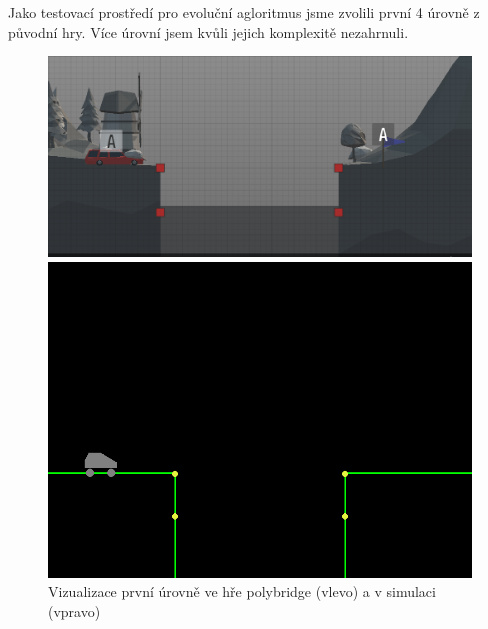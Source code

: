 Jako testovací prostředí pro evoluční agloritmus jsme zvolili první 4 úrovně z původní hry. Více úrovní jsem kvůli jejich komplexitě nezahrnuli.

\begin{figure}[ht]
    \centering
    \begin{minipage}{0.49\textwidth}
        \centering
        \includegraphics[width=\linewidth]{img/poly_lvl1.png}
    \end{minipage}\hfill
    \begin{minipage}{0.49\textwidth}
        \centering
        \includegraphics[width=\linewidth]{img/impl_lvl1.png}
    \end{minipage}
    \caption{Vizualizace první úrovně ve hře polybridge (vlevo) a v simulaci (vpravo)}
    \label{fig:2}
\end{figure}

